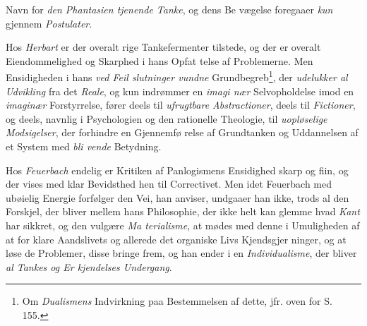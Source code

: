  \setcounter{footnote}{0}%
Navn for \emph{den Phantasien tjenende Tanke}, og dens Be\-%
vægelse foregaaer \emph{kun} gjennem \emph{Postulater}.

Hos \emph{Herbart} er der overalt rige Tankefermenter tilstede,
og der er overalt Eiendommelighed og Skarphed i hans Opfat\-%
telse af Problemerne. Men Ensidigheden i hans \emph{ved Feil\-%
slutninger vundne} Grundbegreb\footnote{Om \emph{Dualismens} Indvirkning paa Bestemmelsen af dette, jfr. oven\-%
for S. 155.}, der \emph{udelukker al
Udvikling} fra det \emph{Reale}, og kun indrømmer en \emph{imagi\-%
nær} Selvopholdelse imod en \emph{imaginær} Forstyrrelse, fører
deels til \emph{ufrugtbare Abstractioner}, deels til \emph{Fictioner},
og deels, navnlig i Psychologien og den rationelle Theologie,
til \emph{uopløselige Modsigelser}, der forhindre en Gjennemfø\-%
relse af Grundtanken og Uddannelsen af et System med \emph{bli\-%
vende} Betydning.

Hos \emph{Feuerbach} endelig er Kritiken af Panlogismens
Ensidighed skarp og fiin, og der vises med klar Bevidsthed
hen til Correctivet. Men idet Feuerbach med ubøielig Energie
forfølger den Vei, han anviser, undgaaer han ikke, trods al
den Forskjel, der bliver mellem hans Philosophie, der ikke
helt kan glemme hvad \emph{Kant} har sikkret, og den vulgære \emph{Ma\-%
terialisme}, at mødes med denne i Umuligheden af at for\-%
klare Aandslivets og allerede det organiske Livs Kjendsgjer\-%
ninger, og at løse de Problemer, disse bringe frem, og han
ender i en \emph{Individualisme}, der bliver \emph{al Tankes og Er\-%
kjendelses Undergang}.

